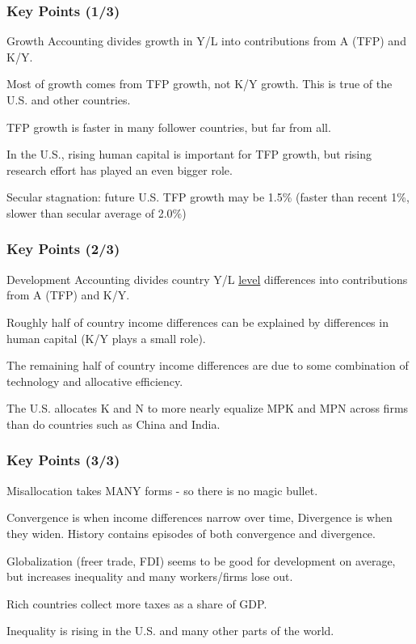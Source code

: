 \documentclass[serif,professionalfont,red,aspectratio=169]{beamer}
\begin{document}
\begin{frame}[t]
\frametitle{Key Points (1/3)}
\vspace{2mm}
Growth Accounting divides growth in Y/L into contributions from
A (TFP) and K/Y.

\vspace{8mm}
Most of growth comes from TFP growth, not K/Y growth. This is
true of the U.S. and other countries.

\vspace{8mm}
TFP growth is faster in many follower countries, but far from all.

\vspace{8mm}
In the U.S., rising human capital is important for TFP growth, but
rising research effort has played an even bigger role.

\vspace{8mm}
Secular stagnation: future U.S. TFP growth may be 1.5\% (faster
than recent 1\%, slower than secular average of 2.0\%)
\end{frame}
\begin{frame}[t]
\frametitle{Key Points (2/3)}
\vspace{2mm}
Development Accounting divides country Y/L \underline{level} differences
into contributions from A (TFP) and K/Y.


\vspace{8mm}
Roughly half of country income differences can be explained by
differences in human capital (K/Y plays a small role).

\vspace{8mm}
The remaining half of country income differences are due to some
combination of technology and allocative efficiency.

\vspace{8mm}
The U.S. allocates K and N to more nearly equalize MPK and MPN
across firms than do countries such as China and India.
\end{frame}
\begin{frame}[t]
\frametitle{Key Points (3/3)}
\vspace{2mm}
Misallocation takes MANY forms - so there is no magic bullet.

\vspace{8mm}
Convergence is when income differences narrow over time,
Divergence is when they widen. History contains episodes of
both convergence and divergence.


\vspace{8mm}
Globalization (freer trade, FDI) seems to be good for development on
average, but increases inequality and many workers/firms lose out.


\vspace{8mm}
Rich countries collect more taxes as a share of GDP.


\vspace{8mm}
Inequality is rising in the U.S. and many other parts of the world.
\end{frame}
\end{document}
